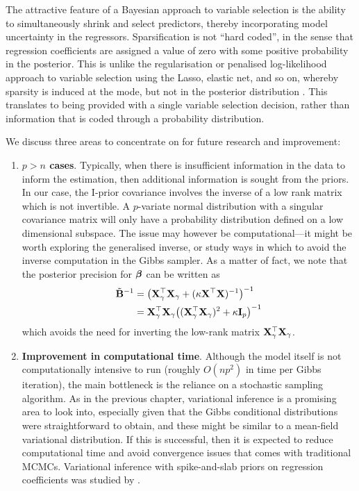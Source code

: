 \documentclass[11pt,twoside,openright]{report}
\begin{document}
The attractive feature of a Bayesian approach to variable selection is the ability to simultaneously shrink and select predictors, thereby incorporating model uncertainty in the regressors.
Sparsification is not ``hard coded'', in the sense that regression coefficients are assigned a value of zero with some positive probability in the posterior.
This is unlike the regularisation or penalised log-likelihood approach to variable selection using the Lasso, elastic net, and so on, whereby sparsity is induced at the mode, but not in the posterior distribution \citep{scott2014predicting}.
This translates to being provided with a single variable selection decision, rather than information that is coded through a probability distribution.

We discuss three areas to concentrate on for future research and improvement:
\begin{enumerate}
  \item \textbf{\boldmath$p>n$ cases}. 
  Typically, when there is insufficient information in the data to inform the estimation, then additional information is sought from the priors. 
  In our case, the I-prior covariance involves the inverse of a low rank matrix which is not invertible.
  A $p$-variate normal distribution with a singular covariance matrix will only have a probability distribution defined on a low dimensional subspace.
  The issue may however be computational---it might be worth exploring the generalised inverse, or study ways in which to avoid the inverse computation in the Gibbs sampler.
  As a matter of fact, we note that the posterior precision for ${\bm\beta}$ can be written as 
  \begin{align*}
    \tilde {{\mathbf B}}^{-1}
    &= \big({\mathbf X}_\gamma^\top {\mathbf X}_\gamma + (\kappa \mathbf X^\top \mathbf X)^{-1}\big)^{-1} \\
    &= {\mathbf X}_\gamma^\top {\mathbf X}_\gamma \big(({\mathbf X}_\gamma^\top {\mathbf X}_\gamma)^2 + \kappa {\mathbf I}_p \big)^{-1}
  \end{align*}
  which avoids the need for inverting the low-rank matrix ${\mathbf X}_\gamma^\top {\mathbf X}_\gamma$.
  
  \item \textbf{Improvement in computational time}. 
  Although the model itself is not computationally intensive to run (roughly $O(np^2)$ in time per Gibbs iteration), the main bottleneck is the reliance on a stochastic sampling algorithm.
  As in the previous chapter, variational inference is a promising area to look into, especially given that the Gibbs conditional distributions were straightforward to obtain, and these might be similar to a mean-field variational distribution.
  If this is successful, then it is expected to reduce computational time and avoid convergence issues that comes with traditional MCMCs.
  Variational inference with spike-and-slab priors on regression coefficients was studied by \citet{ormerod2017variational}.
  

\end{enumerate}
\end{document}
